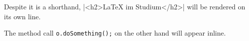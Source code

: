 Despite it is a shorthand, |<h2>LaTeX im Studium</h2>| will be rendered on its own line.

The method call \texttt{o.doSomething();} on the other hand will appear inline.